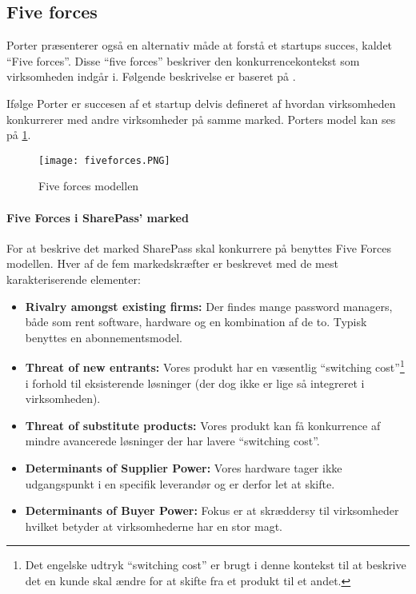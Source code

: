 \subsection{Five forces}
 Porter præsenterer også en alternativ måde at forstå et startups succes, kaldet ``Five forces''.
 Disse ``five forces'' beskriver den konkurrencekontekst som virksomheden indgår i.
 Følgende beskrivelse er baseret på \citet[p.~16]{rose2012software}.

 Ifølge Porter er succesen af et startup delvis defineret af hvordan virksomheden konkurrerer med andre virksomheder på samme marked.
 Porters model kan ses på \cref{fiveforces}.

\begin{figure}[H]
	\texttt{[image: fiveforces.PNG]}
	\caption{Five forces modellen}
	\label{fiveforces}
\end{figure}

\paragraph{Five Forces i SharePass' marked}
\label{par:five_forces_i_sharepass_marked}

For at beskrive det marked SharePass skal konkurrere på benyttes Five Forces modellen. 
Hver af de fem markedskræfter er beskrevet med de mest karakteriserende elementer:

\begin{itemize}
	\item \textbf{Rivalry amongst existing firms:} Der findes mange password managers, både som rent software, hardware og en kombination af de to. Typisk benyttes en abonnementsmodel.
	\item \textbf{Threat of new entrants:} Vores produkt har en væsentlig ``switching cost''\footnote{Det engelske udtryk ``switching cost'' er brugt i denne kontekst til at beskrive det en kunde skal ændre for at skifte fra et produkt til et andet.}  i forhold til eksisterende løsninger (der dog ikke er lige så integreret i virksomheden). 
	\item \textbf{Threat of substitute products:} Vores produkt kan få konkurrence af mindre avancerede løsninger der har lavere ``switching cost''.
	\item \textbf{Determinants of Supplier Power:} Vores hardware tager ikke udgangspunkt i en specifik leverandør og er derfor let at skifte. 
	\item \textbf{Determinants of Buyer Power:} Fokus er at skræddersy til virksomheder hvilket betyder at virksomhederne har en stor magt.
\end{itemize}
